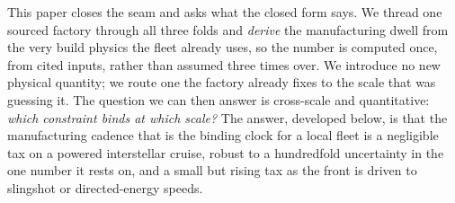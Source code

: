 This paper closes the seam and asks what the closed form says. We thread one sourced factory
through all three folds and \emph{derive} the manufacturing dwell from the very build
physics the fleet already uses, so the number is computed once, from cited inputs, rather
than assumed three times over. We introduce no new physical quantity; we route one the
factory already fixes to the scale that was guessing it. The question we can then answer is
cross-scale and quantitative: \emph{which constraint binds at which scale?} The answer,
developed below, is that the manufacturing cadence that is the binding clock for a local
fleet is a negligible tax on a powered interstellar cruise, robust to a hundredfold uncertainty
in the one number it rests on, and a small but rising tax as the front is driven to slingshot
or directed-energy speeds.
